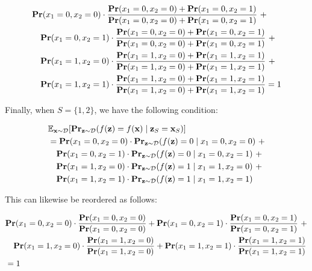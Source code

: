 \documentclass{article}
\newcommand{\z}{\textbf{z}}
\newcommand{\x}{\textbf{x}}
\newcommand{\mbf}[1]{\ensuremath\mathbf{#1}}
\newcommand{\mbb}[1]{\ensuremath\mathbb{#1}}
\begin{document}
\begin{equation*}
\begin{aligned}
& \mbf{Pr}(x_1 = 0, x_2 = 0) \cdot \frac{\mbf{Pr}(x_1 = 0, x_2 = 0) + \mbf{Pr}(x_1 = 0, x_2 = 1)}{\mbf{Pr}(x_1 = 0, x_2 = 0) + \mbf{Pr}(x_1 = 0, x_2 = 1)} \ + \\
&\hspace{1em} \mbf{Pr}(x_1 = 0, x_2 = 1) \cdot \frac{\mbf{Pr}(x_1 = 0, x_2 = 0) + \mbf{Pr}(x_1 = 0, x_2 = 1)}{\mbf{Pr}(x_1 = 0, x_2 = 0) + \mbf{Pr}(x_1 = 0, x_2 = 1)} \ + \\
&\hspace{1em} \mbf{Pr}(x_1 = 1, x_2 = 0) \cdot \frac{\mbf{Pr}(x_1 = 1, x_2 = 0) + \mbf{Pr}(x_1 = 1, x_2 = 1)}{\mbf{Pr}(x_1 = 1, x_2 = 0) + \mbf{Pr}(x_1 = 1, x_2 = 1)} \ + \\
&\hspace{1em} \mbf{Pr}(x_1 = 1, x_2 = 1) \cdot \frac{\mbf{Pr}(x_1 = 1, x_2 = 0) + \mbf{Pr}(x_1 = 1, x_2 = 1)}{\mbf{Pr}(x_1 = 1, x_2 = 0) + \mbf{Pr}(x_1 = 1, x_2 = 1)} = 1
\end{aligned}
\end{equation*}


Finally, when $S = \{1, 2\}$, we have the following condition:

\begin{equation*}
\begin{aligned}
&\mbb{E}_{\x\sim \mathcal{D}}[\mbf{Pr}_{\z\sim \mathcal{D}}(f(\z) = f(\x) \mid \z_{S} = \x_{S})] \\
&= \mbf{Pr}(x_1 = 0, x_2 = 0) \cdot \mbf{Pr}_{\z\sim \mathcal{D}}(f(\z) = 0 \mid x_1 = 0, x_2 = 0) \ + \\
&\hspace{1em} \mbf{Pr}(x_1 = 0, x_2 = 1) \cdot \mbf{Pr}_{\z\sim \mathcal{D}}(f(\z) = 0 \mid x_1 = 0, x_2 = 1) \ + \\
&\hspace{1em} \mbf{Pr}(x_1 = 1, x_2 = 0) \cdot \mbf{Pr}_{\z\sim \mathcal{D}}(f(\z) = 1 \mid x_1 = 1, x_2 = 0) \ + \\
&\hspace{1em} \mbf{Pr}(x_1 = 1, x_2 = 1) \cdot \mbf{Pr}_{\z\sim \mathcal{D}}(f(\z) = 1 \mid x_1 = 1, x_2 = 1) 
\end{aligned}
\end{equation*}

This can likewise be reordered as follows:

\begin{equation*}
\begin{aligned}
&\mbf{Pr}(x_1 = 0, x_2 = 0) \cdot \frac{\mbf{Pr}(x_1 = 0, x_2 = 0)}{\mbf{Pr}(x_1 = 0, x_2 = 0)} + 
\mbf{Pr}(x_1 = 0, x_2 = 1) \cdot \frac{\mbf{Pr}(x_1 = 0, x_2 = 1)}{\mbf{Pr}(x_1 = 0, x_2 = 1)} \ + \\
&\hspace{1em} \mbf{Pr}(x_1 = 1, x_2 = 0) \cdot \frac{\mbf{Pr}(x_1 = 1, x_2 = 0)}{\mbf{Pr}(x_1 = 1, x_2 = 0)} + 
\mbf{Pr}(x_1 = 1, x_2 = 1) \cdot \frac{\mbf{Pr}(x_1 = 1, x_2 = 1)}{\mbf{Pr}(x_1 = 1, x_2 = 1)} \\
%
&= 1
\end{aligned}
\end{equation*}
\end{document}
